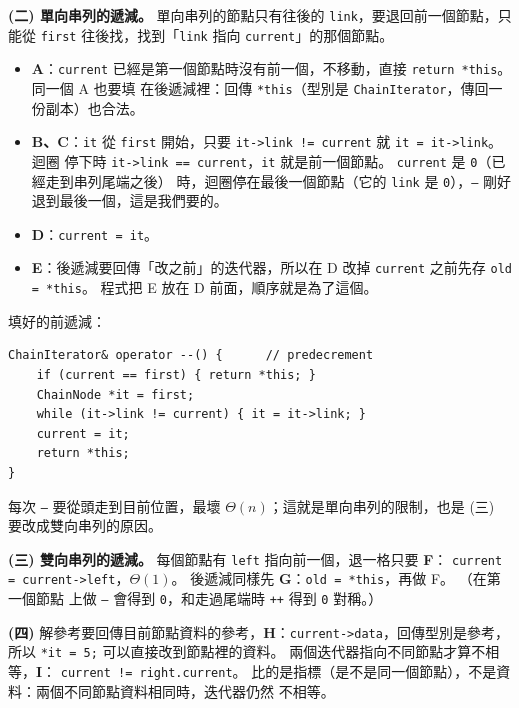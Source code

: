 \begin{pastsoln}
\textbf{(二) 單向串列的遞減。} 單向串列的節點只有往後的 \texttt{link}，要退回前一個節點，只能從 \texttt{first}
往後找，找到「\texttt{link} 指向 \texttt{current}」的那個節點。
\begin{itemize}
\item \textbf{A}：\texttt{current} 已經是第一個節點時沒有前一個，不移動，直接 \texttt{return *this}。 同一個 A 也要填
在後遞減裡：回傳 \texttt{*this}（型別是 \texttt{ChainIterator}，傳回一份副本）也合法。
\item \textbf{B、C}：\texttt{it} 從 \texttt{first} 開始，只要 \texttt{it->link != current} 就 \texttt{it = it->link}。 迴圈
停下時 \texttt{it->link == current}，\texttt{it} 就是前一個節點。 \texttt{current} 是 \texttt{0}（已經走到串列尾端之後）
時，迴圈停在最後一個節點（它的 \texttt{link} 是 \texttt{0}），\texttt{--} 剛好退到最後一個，這是我們要的。
\item \textbf{D}：\texttt{current = it}。
\item \textbf{E}：後遞減要回傳「改之前」的迭代器，所以在 D 改掉 \texttt{current} 之前先存 \texttt{old = *this}。
程式把 E 放在 D 前面，順序就是為了這個。
\end{itemize}
填好的前遞減：
\begin{verbatim}
ChainIterator& operator --() {      // predecrement
    if (current == first) { return *this; }
    ChainNode *it = first;
    while (it->link != current) { it = it->link; }
    current = it;
    return *this;
}
\end{verbatim}
每次 \texttt{--} 要從頭走到目前位置，最壞 $\Theta(n)$；這就是單向串列的限制，也是 (三) 要改成雙向串列的原因。

\textbf{(三) 雙向串列的遞減。} 每個節點有 \texttt{left} 指向前一個，退一格只要 \textbf{F}：
\texttt{current = current->left}，$\Theta(1)$。 後遞減同樣先 \textbf{G}：\texttt{old = *this}，再做 F。 （在第一個節點
上做 \texttt{--} 會得到 \texttt{0}，和走過尾端時 \texttt{++} 得到 \texttt{0} 對稱。）

\textbf{(四)} 解參考要回傳目前節點資料的參考，\textbf{H}：\texttt{current->data}，回傳型別是參考，所以
\texttt{*it = 5;} 可以直接改到節點裡的資料。 兩個迭代器指向不同節點才算不相等，\textbf{I}：
\texttt{current != right.current}。 比的是指標（是不是同一個節點），不是資料：兩個不同節點資料相同時，迭代器仍然
不相等。
\end{pastsoln}
